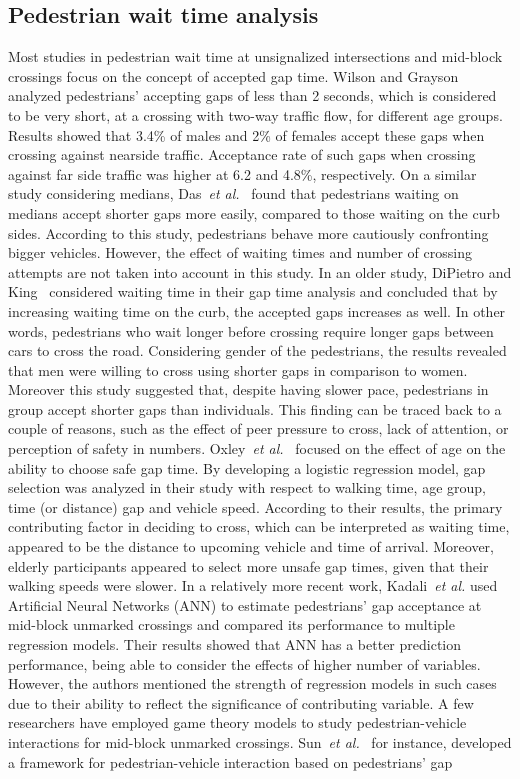 \subsection{Pedestrian wait time analysis}
Most studies in pedestrian wait time at unsignalized intersections and mid-block crossings focus on the concept of accepted gap time. Wilson and Grayson~\cite{wilson1980age} analyzed pedestrians' accepting gaps of less than 2 seconds, which is considered to be very short, at a crossing with two-way traffic flow, for different age groups. Results showed that 3.4\% of males and 2\% of females accept these gaps when crossing against nearside traffic. Acceptance rate of such gaps when crossing against far side traffic was higher at 6.2 and 4.8\%, respectively.
On a similar study considering medians, Das~\textit{et al.}~\cite{das2005walk} found that pedestrians waiting on medians accept shorter gaps more easily, compared to those waiting on the curb sides.  According to this study, pedestrians behave more cautiously confronting bigger vehicles. However, the effect of waiting times and number of crossing attempts are not taken into account in this study. In an older study, DiPietro and King~\cite{dipietro1970pedestrian} considered waiting time in their gap time analysis and concluded that by increasing waiting time on the curb, the accepted gaps increases as well. In other words, pedestrians who wait longer before crossing require longer gaps between cars to cross the road. Considering gender of the pedestrians, the results revealed that men were willing to cross using shorter gaps in comparison to women. Moreover this study suggested that, despite having slower pace, pedestrians in group accept shorter gaps than individuals. This finding can be traced back to a couple of reasons, such as the effect of peer pressure to cross, lack of attention, or perception of safety in numbers. Oxley~\textit{et al.}~\cite{oxley2005crossing} focused on the effect of age on the ability to choose safe gap time. By developing a logistic regression model, gap selection was analyzed in their study with respect to walking time, age group, time (or distance) gap and vehicle speed. According to their results, the primary contributing factor in deciding to cross, which can be interpreted as waiting time, appeared to be the distance to upcoming vehicle and time of arrival. Moreover, elderly participants appeared to select more unsafe gap times, given that their walking speeds were slower. In a relatively more recent work, Kadali~\textit{et al.} used Artificial Neural Networks (ANN) to estimate pedestrians' gap acceptance at mid-block unmarked crossings and compared its performance to multiple regression models. Their results showed that ANN has a better prediction performance, being able to consider the effects of higher number of variables. However, the authors mentioned the strength of regression models in such cases due to their ability to reflect the significance of contributing variable. A few researchers have employed game theory models to study pedestrian-vehicle interactions for mid-block unmarked crossings. Sun~\textit{et al.}~\cite{sun2003modeling} for instance, developed a framework for pedestrian-vehicle interaction based on pedestrians’ gap 